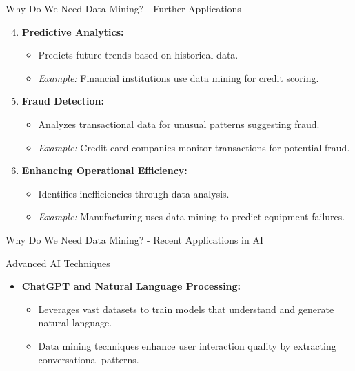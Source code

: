 \documentclass[aspectratio=169]{beamer}
\begin{document}
\begin{frame}[fragile]{Why Do We Need Data Mining? - Further Applications}
    \begin{enumerate}
        \setcounter{enumi}{3}
        \item \textbf{Predictive Analytics:}
            \begin{itemize}
                \item Predicts future trends based on historical data.
                \item \textit{Example:} Financial institutions use data mining for credit scoring.
            \end{itemize}

        \item \textbf{Fraud Detection:}
            \begin{itemize}
                \item Analyzes transactional data for unusual patterns suggesting fraud.
                \item \textit{Example:} Credit card companies monitor transactions for potential fraud.
            \end{itemize}
        
        \item \textbf{Enhancing Operational Efficiency:}
            \begin{itemize}
                \item Identifies inefficiencies through data analysis.
                \item \textit{Example:} Manufacturing uses data mining to predict equipment failures.
            \end{itemize}
    \end{enumerate}
\end{frame}

\begin{frame}[fragile]{Why Do We Need Data Mining? - Recent Applications in AI}
    \begin{block}{Advanced AI Techniques}
        \begin{itemize}
            \item \textbf{ChatGPT and Natural Language Processing:} 
            \begin{itemize}
                \item Leverages vast datasets to train models that understand and generate natural language.
                \item Data mining techniques enhance user interaction quality by extracting conversational patterns.
            \end{itemize}
        \end{itemize}
    \end{block}
\end{frame}
\end{document}
